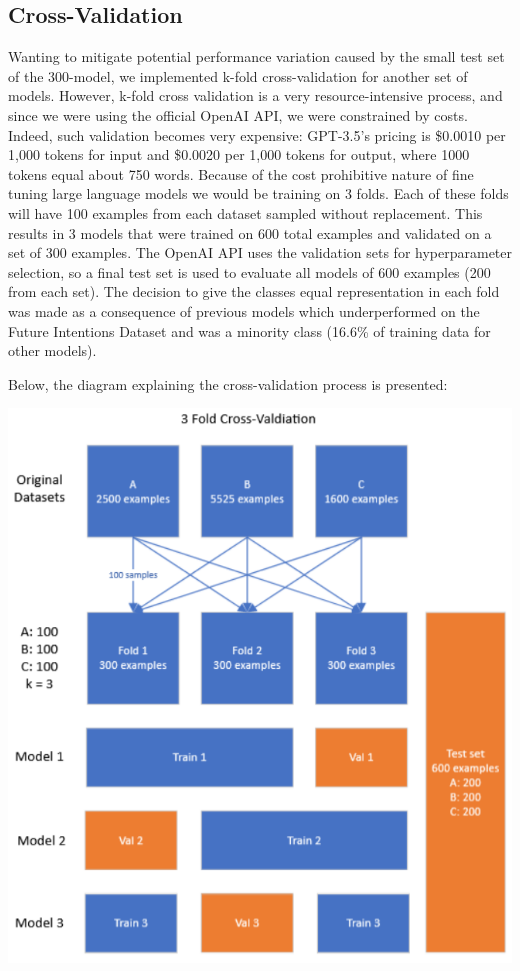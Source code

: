 \documentclass[10pt,twocolumn,letterpaper]{article}
\begin{document}
\subsection{Cross-Validation}

Wanting to mitigate potential performance variation caused by the small test set of the 300-model, 
we implemented k-fold cross-validation for another set of models.
However, k-fold cross validation is a very resource-intensive process, and since we were using the official OpenAI API,
we were constrained by costs. Indeed, such validation becomes very expensive: GPT-3.5's pricing is \$0.0010 per 1,000 tokens 
for input and \$0.0020 per 1,000 tokens for output, where 1000 tokens equal about 750 words.
Because of the cost prohibitive nature of fine tuning large language models we would be training on 3 folds. 
Each of these folds will have 100 examples from each dataset sampled without replacement. 
This results in 3 models that were trained on 600 total examples and validated on a set of 300 examples. 
The OpenAI API uses the validation sets for hyperparameter selection, so a final test set is used to evaluate all models 
of 600 examples (200 from each set). The decision to give the classes equal representation in each fold was made as 
a consequence of previous models which underperformed on the Future Intentions Dataset and was
a minority class (16.6\% of training data for other models).

Below, the diagram explaining the cross-validation process is presented:

\begin{center}
\includegraphics*[scale=0.55]{img/cross_validation.png}
\end{center}
\end{document}
